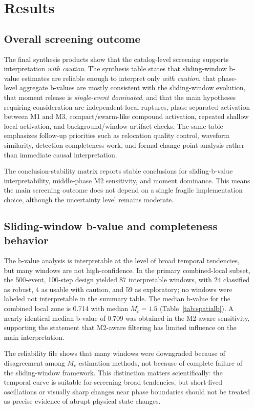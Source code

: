\documentclass[11pt]{article}
\begin{document}
\section{Results}
\subsection{Overall screening outcome}
The final synthesis products show that the catalog-level screening supports interpretation \emph{with caution}. The synthesis table states that sliding-window b-value estimates are reliable enough to interpret only \emph{with caution}, that phase-level aggregate b-values are mostly consistent with the sliding-window evolution, that moment release is \emph{single-event dominated}, and that the main hypotheses requiring consideration are independent local ruptures, phase-separated activation between M1 and M3, compact/swarm-like compound activation, repeated shallow local activation, and background/window artifact checks. The same table emphasizes follow-up priorities such as relocation quality control, waveform similarity, detection-completeness work, and formal change-point analysis rather than immediate causal interpretation.

The conclusion-stability matrix reports stable conclusions for sliding-b-value interpretability, middle-phase M2 sensitivity, and moment dominance. This means the main screening outcome does not depend on a single fragile implementation choice, although the uncertainty level remains moderate.

\subsection{Sliding-window b-value and completeness behavior}
The b-value analysis is interpretable at the level of broad temporal tendencies, but many windows are not high-confidence. In the primary combined-local subset, the 500-event, 100-step design yielded 87 interpretable windows, with 24 classified as robust, 4 as usable with caution, and 59 as exploratory; no windows were labeled not interpretable in the summary table. The median b-value for the combined local zone is 0.714 with median $M_c=1.5$ (Table~\ref{tab:spatialb}). A nearly identical median b-value of 0.709 was obtained in the M2-aware sensitivity, supporting the statement that M2-aware filtering has limited influence on the main interpretation.

The reliability file shows that many windows were downgraded because of disagreement among $M_c$ estimation methods, not because of complete failure of the sliding-window framework. This distinction matters scientifically: the temporal curve is suitable for screening broad tendencies, but short-lived oscillations or visually sharp changes near phase boundaries should not be treated as precise evidence of abrupt physical state changes.
\end{document}
